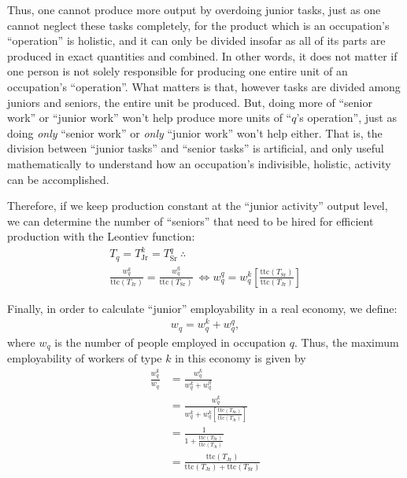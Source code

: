\documentclass{elsarticle} %
\begin{document}
Thus, one cannot produce more output by overdoing junior tasks, just as one cannot neglect these tasks completely, for the product which is an occupation's ``operation'' is holistic, and it can only be divided insofar as all of its parts are produced in exact quantities and combined. In other words, it does not matter if one person is not solely responsible for producing one entire unit of an occupation's ``operation''. What matters is that, however tasks are divided among juniors and seniors, the entire unit be produced. But, doing more of ``senior work'' or ``junior work'' won't help produce more units of ``$q$'s operation'', just as doing \textit{only} ``senior work'' or \textit{only} ``junior work'' won't help either. That is, the division between ``junior tasks'' and ``senior tasks'' is artificial, and only useful mathematically to understand how an occupation's indivisible, holistic, activity can be accomplished.  

Therefore, if we keep production constant at the ``junior activity'' output level, we can determine the number of ``seniors'' that need to be hired for efficient production  with the Leontiev function:
\begin{gather*}
    T_q = T_{\text{Jr}}^{k} = T_{\text{Sr}}^{q}
    \ \therefore \\
    \frac{w_{q}^{k}}{\text{ttc}(T_{\text{Jr}})} = 
    \frac{w_{q}^{q}}{\text{ttc}(T_{\text{Sr}})}
    \ \iff
    w_{q}^{q} = 
    w_{q}^{k}
    \left[
        \frac{
            \text{ttc}(T_{\text{Sr}})
        }{
            \text{ttc}(T_{\text{Jr}})
        }
    \right]
\end{gather*}

Finally, in order to calculate ``junior'' employability in a real economy, we define:
\begin{gather*}
    w_{q} = 
    w_{q}^{k} +
    w_{q}^{q} 
    ,
\end{gather*}
where $w_{q}$ is the number of people employed in occupation $q$. Thus, the maximum employability of workers of type $k$ in this economy is given by
\begin{align*}
    \frac{
        w_{q}^{k}
    }{
        w_{q}
    }
    & =
    \frac{
        w_{q}^{k}
    }{
        w_{q}^{k} + w_{q}^{q}
    }
    \\
    & =
    \frac{
        w_{q}^{k}
    }{
        w_{q}^{k} + 
        w_{q}^{k}
    \left[
        \frac{
            \text{ttc}(T_{\text{Sr}})
        }{
            \text{ttc}(T_{\text{Jr}})
        }
    \right]
    }
    \\
    & =
    \frac{
        1
    }{
        1 + 
        \frac{
            \text{ttc}(T_{\text{Sr}})
        }{
            \text{ttc}(T_{\text{Jr}})
        }
    }
    \\
    & =
    \frac{
        \text{ttc}(T_{\text{Jr}})
    }{
        \text{ttc}(T_{\text{Jr}}) + 
        \text{ttc}(T_{\text{Sr}})
    }
\end{align*}
\end{document}
